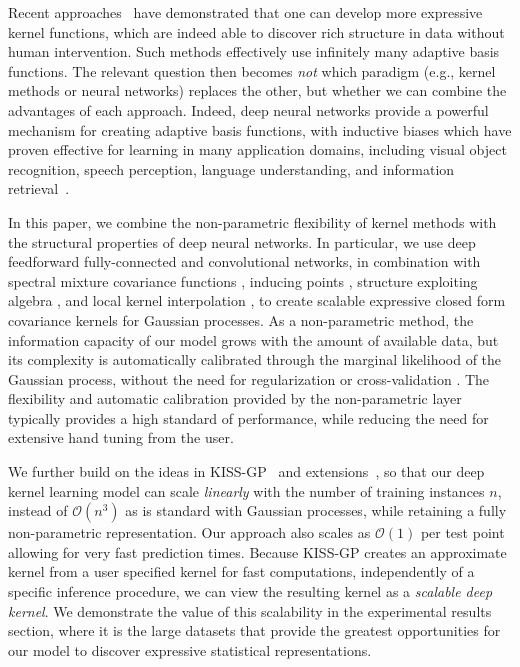 \documentclass[twoside,11pt]{article}
\begin{document}
Recent approaches~\citep[e.g.,][]{wilson2014thesis, wilsonadams2013, lloyd2014, yang2015carte}
have demonstrated that one
can develop more expressive kernel functions,
which are indeed able to discover rich structure in data without human intervention.
Such methods effectively use infinitely many adaptive basis functions.  The relevant question then
becomes \emph{not} which paradigm (e.g., kernel methods or neural networks) replaces the other, but
whether we can combine the advantages of each approach.  Indeed, deep neural networks provide a
powerful mechanism for creating adaptive basis functions, with inductive biases which have proven
effective for learning in many application domains, including visual object recognition, speech
perception, language understanding, and information retrieval~\citep{alex2012,deepSpeechReviewSPM2012,SocherHPNM11,kirosTACL,Xu2015}.

In this paper, we combine the non-parametric flexibility of kernel methods with
the structural properties of deep neural networks.  In particular, we 
use deep feedforward fully-connected
and convolutional networks, in combination with spectral mixture covariance functions
\citep{wilsonadams2013}, inducing points \citep{quinonero2005unifying}, structure exploiting algebra \citep{saatchi11}, and local 
kernel interpolation \citep{wilsonnickisch2015, wdn2015}, to create scalable expressive closed form covariance kernels for Gaussian processes.
As a non-parametric method, the information capacity of our model grows with the amount of available
data, but its complexity is automatically calibrated through the marginal likelihood of the Gaussian
process, without the need for regularization or cross-validation \citep{rasmussen01, rasmussen06,
wilson2014thesis}.  The flexibility and automatic calibration provided by the non-parametric layer
typically provides a high standard of performance, while reducing the need for extensive hand tuning from
the user.


We further build on the ideas in KISS-GP~\citep{wilsonnickisch2015} and extensions~\citep{wdn2015}, 
so that our deep kernel learning model can scale \emph{linearly} with the number of training instances $n$, instead of
$\mathcal{O}(n^3)$ as is standard with Gaussian processes, while retaining a fully non-parametric
representation. Our approach also scales as $\mathcal{O}(1)$ per test point 
allowing for very fast prediction times.  Because KISS-GP creates an approximate kernel from a user
specified kernel for fast computations, independently of a specific inference procedure, we can view the resulting kernel
as a \emph{scalable deep kernel}.  We demonstrate the value of this scalability in the experimental results section,
where it is the large datasets that provide the greatest opportunities for our model
to discover expressive statistical representations.
\end{document}
